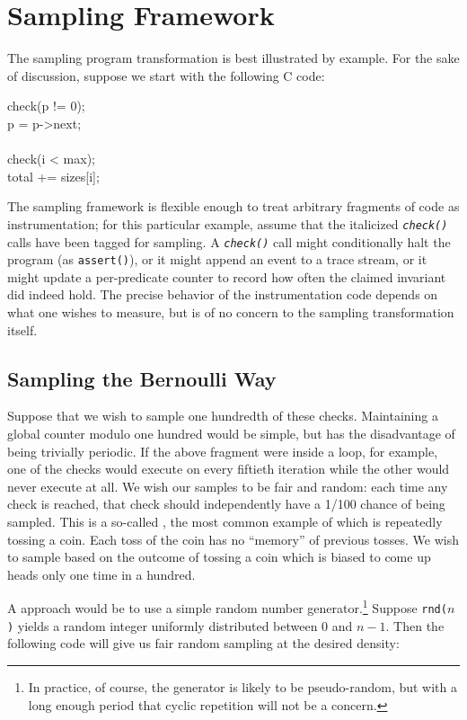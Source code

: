 \section{Sampling Framework}
\label{sec:framework}

The sampling program transformation is best illustrated by example.
For the sake of discussion, suppose we start with the following C
code:

\begin{code}
  check(p != 0); \\
  \up p = p->next; \\
  \\
  check(i < max); \\
  \up total += sizes[i];
\end{code}

The sampling framework is flexible enough to treat arbitrary fragments
of code as instrumentation; for this particular example, assume that
the italicized \texttt{\textit{check()}} calls have been tagged for
sampling.  A \texttt{\textit{check()}} call might conditionally halt
the program (as \texttt{assert()}), or it might append an event to a
trace stream, or it might update a per-predicate counter to record how
often the claimed invariant did indeed hold.  The precise behavior of
the instrumentation code depends on what one wishes to measure, but is
of no concern to the sampling transformation itself.

\subsection{Sampling the Bernoulli Way}

Suppose that we wish to sample one hundredth of these checks.
Maintaining a global counter modulo one hundred would be simple, but
has the disadvantage of being trivially periodic.  If the above
fragment were inside a loop, for example, one of the checks would
execute on every fiftieth iteration while the other would never
execute at all.  We wish our samples to be fair and random: each time
any check is reached, that check should independently have a 1/100
chance of being sampled.  This is a so-called , the most common example of which is repeatedly tossing a
coin.  Each toss of the coin has no ``memory'' of previous tosses.  We
wish to sample based on the outcome of tossing a coin which is biased
to come up heads only one time in a hundred.

A \naive approach would be to use a simple random number
generator.\footnote{In practice, of course, the generator is likely to
  be pseudo-random, but with a long enough period that cyclic
  repetition will not be a concern.}  Suppose \texttt{rnd($n$)} yields
a random integer uniformly distributed between 0 and $n-1$.  Then the
following code will give us fair random sampling at the desired
density:

